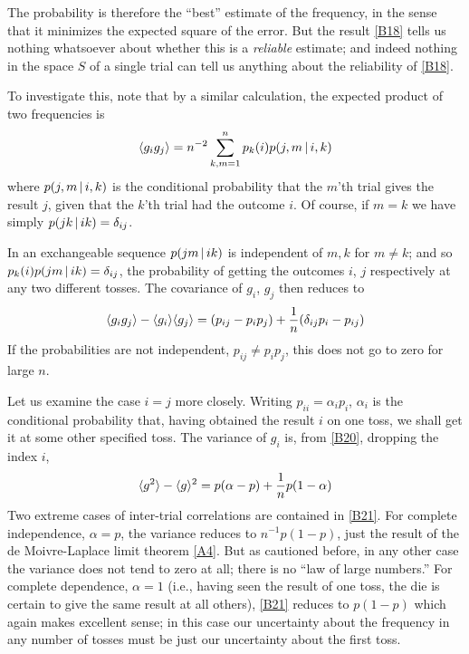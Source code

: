The probability is therefore the ``best'' estimate of the frequency, in the sense that it minimizes the expected square of the error.
But the result \eqref{B18} tells us nothing whatsoever about whether this is a \emph{reliable} estimate; and indeed nothing in the space $S$ of a single trial can tell us anything about the reliability of \eqref{B18}.

To investigate this, note that by a similar calculation, the expected product of two frequencies is
\begin{equation}
	\label{B19}
	\langle g_ig_j\rangle = n^{-2} \sum_{k, m = 1}^{n} p_k(i) p(j, m\,\vert\, i, k)
\end{equation}
where $p(j, m\,\vert\, i, k)$ is the conditional probability that the $m$'th trial gives the result $j$, given that the $k$'th trial had the outcome $i$.
Of course, if $m=k$ we have simply $p(jk\,\vert\, ik) = \delta_{ij}$.

In an exchangeable sequence $p(jm \,\vert\, ik)$ is independent of $m,k$ for $m \neq k$; and so $p_k(i) p(jm\,\vert\, ik) = \delta_{ij}$, the probability of getting the outcomes $i$, $j$ respectively at any two different tosses.
The covariance of $g_i$, $g_j$ then reduces to
\begin{equation}
	\label{B20}
	\langle g_i g_j\rangle - \langle g_i\rangle \langle g_j\rangle = (p_{ij} - p_i p_j) + \frac{1}{n} (\delta_{ij}p_i - p_{ij})
\end{equation}
If the probabilities are not independent, $p_{ij} \neq p_i p_j$, this does not go to zero for large $n$.

Let us examine the case $i=j$ more closely.
Writing $p_{ii} = \alpha_i p_i$, $\alpha_i$ is the conditional probability that, having obtained the result $i$ on one toss, we shall get it at some other specified toss.
The variance of $g_i$ is, from \eqref{B20}, dropping the index $i$,
\begin{equation}
	\label{B21}
	\langle g^2\rangle - \langle g\rangle^2 = p(\alpha - p) + \frac{1}{n} p(1 - \alpha)
\end{equation}
Two extreme cases of inter-trial correlations are contained in \eqref{B21}.
For complete independence, $\alpha = p$, the variance reduces to $n^{-1} p (1-p)$, just the result of the de Moivre-Laplace limit theorem \eqref{A4}.
But as cautioned before, in any other case the variance does not tend to zero at all; there is no ``law of large numbers.''
For complete dependence, $\alpha = 1$ (i.e., having seen the result of one toss, the die is certain to give the same result at all others), \eqref{B21} reduces to $p(1-p)$ which again makes excellent sense; in this case our uncertainty about the frequency in any number of tosses must be just our uncertainty about the first toss.

